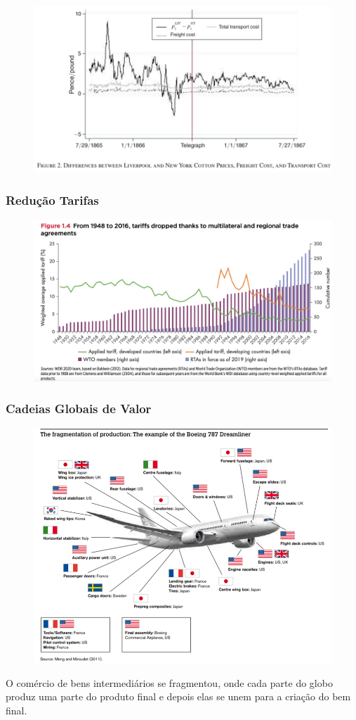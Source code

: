 \documentclass[a4paper,12pt]{article}[abntex2]
\begin{document}
\begin{figure}[H]
    \centering
    \includegraphics[width=0.70\linewidth]{Imagens/a1i5.png}
\end{figure}

\subsubsection{\textbf{Redução Tarifas}}
\begin{figure}[H]
    \centering
    \includegraphics[width=0.70\linewidth]{Imagens/a1i6.png}
\end{figure}

\subsubsection{\textbf{Cadeias Globais de Valor}}
\begin{figure}[H]
    \centering
    \includegraphics[width=0.70\linewidth]{Imagens/a1i7.png}
\end{figure}
O comércio de bens intermediários se fragmentou, onde cada parte do globo produz uma parte do produto final e depois elas se unem para a criação do bem final. 
\end{document}
